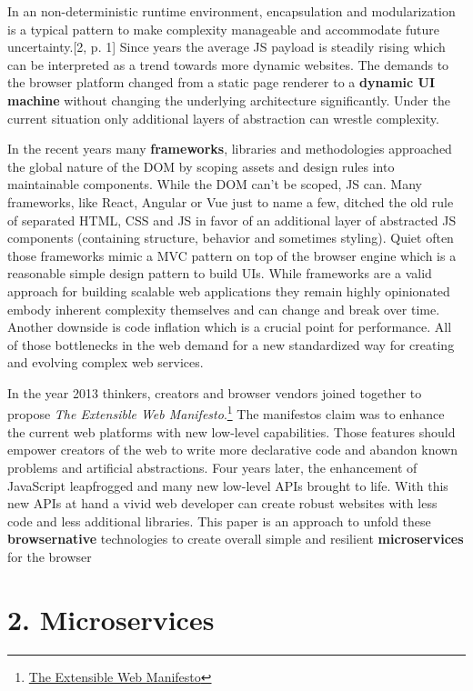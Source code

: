 \documentclass[]{article}
\begin{document}
In an non-deterministic runtime environment, encapsulation and
modularization is a typical pattern to make complexity manageable and
accommodate future uncertainty.{[}2, p. 1{]} Since years the average JS
payload is steadily rising which can be interpreted as a trend towards
more dynamic websites. The demands to the browser platform changed from
a static page renderer to a \textbf{dynamic UI machine} without changing
the underlying architecture significantly. Under the current situation
only additional layers of abstraction can wrestle complexity.

In the recent years many \textbf{frameworks}, libraries and
methodologies approached the global nature of the DOM by scoping assets
and design rules into maintainable components. While the DOM can't be
scoped, JS can. Many frameworks, like React, Angular or Vue just to name
a few, ditched the old rule of separated HTML, CSS and JS in favor of an
additional layer of abstracted JS components (containing structure,
behavior and sometimes styling). Quiet often those frameworks mimic a
MVC pattern on top of the browser engine which is a reasonable simple
design pattern to build UIs. While frameworks are a valid approach for
building scalable web applications they remain highly opinionated embody
inherent complexity themselves and can change and break over time.
Another downside is code inflation which is a crucial point for
performance. All of those bottlenecks in the web demand for a new
standardized way for creating and evolving complex web services.

In the year 2013 thinkers, creators and browser vendors joined together
to propose \emph{The Extensible Web Manifesto}.\footnote{\href{https://extensiblewebmanifesto.org/}{The
  Extensible Web Manifesto}} The manifestos claim was to enhance the
current web platforms with new low-level capabilities. Those features
should empower creators of the web to write more declarative code and
abandon known problems and artificial abstractions. Four years later,
the enhancement of JavaScript leapfrogged and many new low-level APIs
brought to life. With this new APIs at hand a vivid web developer can
create robust websites with less code and less additional libraries.
This paper is an approach to unfold these \textbf{browsernative}
technologies to create overall simple and resilient
\textbf{microservices} for the browser

\section{2. Microservices}\label{microservices}
\end{document}
